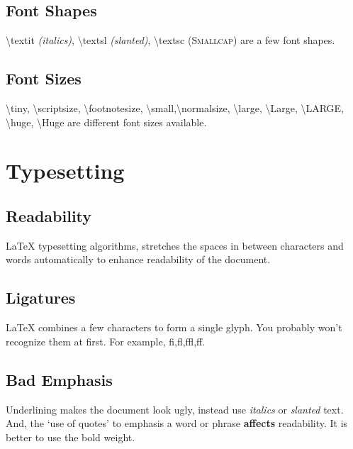 \documentclass{article}
\begin{document}
\subsection{Font Shapes}
\textbackslash textit \textit{(italics)}, \textbackslash textsl \textsl{(slanted)}, \textbackslash textsc \textsc{(Smallcap)} are a few font shapes.

\subsection{Font Sizes}
\tiny \textbackslash tiny, \scriptsize \textbackslash scriptsize, \footnotesize \textbackslash footnotesize, \small \textbackslash small,\normalsize \textbackslash normalsize, \large \textbackslash large, \Large \textbackslash Large, \LARGE \textbackslash LARGE, \huge \textbackslash huge, \Huge \textbackslash Huge \normalsize are different font sizes available.

\section{Typesetting}
\subsection{Readability}
\LaTeX{} typesetting algorithms, stretches the spaces in between characters and words automatically to enhance readability of the document.

\subsection{Ligatures}
\LaTeX{} combines a few characters to form a single glyph. You probably won't recognize them at first. For example, fi,fl,ffl,ff.

\subsection{Bad Emphasis}
Underlining makes the document look ugly, instead use \textit{italics} or \textsl{slanted} text. And, the `use of quotes' to emphasis a word or phrase \textbf{affects} readability. It is better to use the bold weight.
\end{document}
